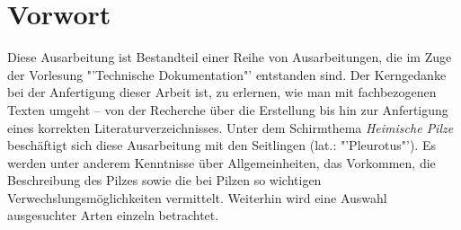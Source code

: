\documentclass[a4paper,abstracton]{scrreprt}
\begin{document}


\tableofcontents
\listoffigures

\begin{abstract}
\begin{quote}%
TODO: ersetzen

Diese Arbeit befasst sich mit der Beschreibung einer Pilzgattung in der Ordnung der Champignonartigen, in der Familie der Seitlingsverwandten. Es handelt sich dabei um die sogenannten \emph{Seitlinge -- lateinisch Pleurotus --}.
\end{quote} 
\end{abstract}

\chapter{Vorwort}
Diese Ausarbeitung ist Bestandteil einer Reihe von Ausarbeitungen, die im Zuge der Vorlesung "'Technische Dokumentation"' entstanden sind. Der Kerngedanke bei der Anfertigung dieser Arbeit ist, zu erlernen, wie man mit fachbezogenen Texten umgeht -- von der Recherche über die Erstellung bis hin zur Anfertigung eines korrekten Literaturverzeichnisses. Unter dem Schirmthema \emph{Heimische Pilze} beschäftigt sich diese Ausarbeitung mit den Seitlingen (lat.: "'Pleurotus"'). Es werden unter anderem Kenntnisse über Allgemeinheiten, das Vorkommen, die Beschreibung des Pilzes sowie die bei Pilzen so wichtigen Verwechslungsmöglichkeiten vermittelt. Weiterhin wird eine Auswahl ausgesuchter Arten einzeln betrachtet.
\end{document}
